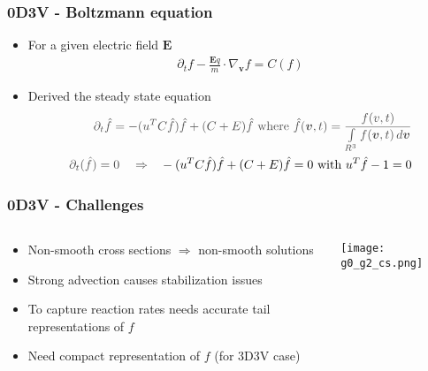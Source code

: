 \documentclass[mathserif, aspectratio=169]{beamer}
\newcommand{\vect}[1]{\boldsymbol{#1}}
\newcommand{\myint}{\int\limits}
\newcommand{\diff}[1]{\, d#1}
\begin{document}
\begin{frame}
	\frametitle{0D3V - Boltzmann equation}
	\begin{itemize}
		\item For a given electric field $\vect{E}$
		\begin{align}
			\partial_t f -\frac{\vect{E} q}{m} \cdot \nabla_{\vect{v }}f = C(f)
		\end{align} 
		\item Derived the steady state equation
		\begin{align}
			\textcolor{black!70}{\partial_t \hat{f} = -(u^T C \hat{f}) \hat{f} + (C+E)\hat{f} \text{ where } \hat{f}(\vect{v},t) = \frac{f(v,t)}{\myint_{R^3} f(\vect{v},t) \diff{\vect{v}}}}\\
			\textcolor{black!70}{\partial_t (\hat{f}) = 0 \ \ \  \Rightarrow} \ \ \  -(u^T C \hat{f}) \hat{f} + (C+E)\hat{f} =0  \text{ with } u^T \hat{f}-1=0
		\end{align}
	\end{itemize}
\end{frame}

\begin{frame}
	\frametitle{0D3V - Challenges}
	\begin{columns}
		\begin{column}{0.45\textwidth}
			\begin{itemize}
				\item Non-smooth cross sections $\Rightarrow$ non-smooth solutions
				\item Strong advection causes stabilization issues
				\item To capture reaction rates needs accurate tail representations of $f$
				\item Need compact representation of $f$ (for 3D3V case)
			\end{itemize}
		\end{column}
		\begin{column}{0.45\textwidth}
			\begin{center}
				\texttt{[image: g0\_g2\_cs.png]}
			\end{center}
		\end{column}
	\end{columns}
\end{frame}
\end{document}
